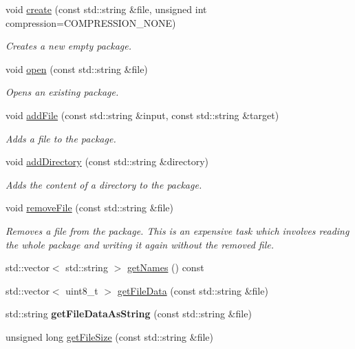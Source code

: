 \begin{DoxyCompactItemize}
\item 
void \hyperlink{classzt_1_1_package_a985b5fd2f225911709782ec42ea8dc48}{create} (const std\+::string \&file, unsigned int compression=C\+O\+M\+P\+R\+E\+S\+S\+I\+O\+N\+\_\+\+N\+O\+NE)
\begin{DoxyCompactList}\small\item\em Creates a new empty package. \end{DoxyCompactList}\item 
void \hyperlink{classzt_1_1_package_a30d7195cbd7b4856dda6207fd8ec785b}{open} (const std\+::string \&file)
\begin{DoxyCompactList}\small\item\em Opens an existing package. \end{DoxyCompactList}\item 
void \hyperlink{classzt_1_1_package_a5410213f58e0f08e648d6424474e0a5d}{add\+File} (const std\+::string \&input, const std\+::string \&target)
\begin{DoxyCompactList}\small\item\em Adds a file to the package. \end{DoxyCompactList}\item 
void \hyperlink{classzt_1_1_package_a6f528593a7a56b9d2c7ec6df0a6b2bb2}{add\+Directory} (const std\+::string \&directory)
\begin{DoxyCompactList}\small\item\em Adds the content of a directory to the package. \end{DoxyCompactList}\item 
void \hyperlink{classzt_1_1_package_af62e37955ffe46a4c37cd76c99405763}{remove\+File} (const std\+::string \&file)
\begin{DoxyCompactList}\small\item\em Removes a file from the package. This is an expensive task which involves reading the whole package and writing it again without the removed file. \end{DoxyCompactList}\item 
std\+::vector$<$ std\+::string $>$ \hyperlink{classzt_1_1_package_a9454a5a20192952e1d4d2c0ef9e434f4}{get\+Names} () const
\item 
std\+::vector$<$ uint8\+\_\+t $>$ \hyperlink{classzt_1_1_package_ab30b4acb16a680075b9d61de978181f4}{get\+File\+Data} (const std\+::string \&file)
\item 
\mbox{\label{classzt_1_1_package_a33d762728678ba4b1769cf99440e54bc}} 
std\+::string {\bfseries get\+File\+Data\+As\+String} (const std\+::string \&file)
\item 
unsigned long \hyperlink{classzt_1_1_package_a5c8234b81f3076072f5284a257bf0b51}{get\+File\+Size} (const std\+::string \&file)
\end{DoxyCompactItemize}
